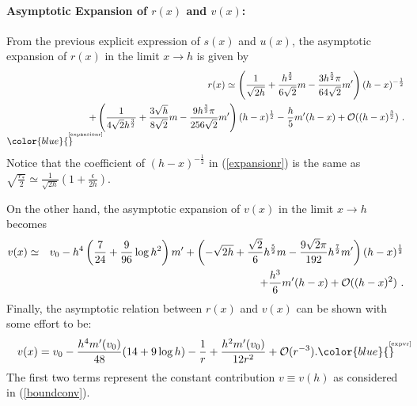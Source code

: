 \documentclass[12pt]{article}
\newcommand{\be}{\begin{equation}}
\newcommand{\ee}{\end{equation}}
\def\req#1{(\ref{#1})}
\def\s{\sigma}
\def\CO{{\cal O}}
\def\f#1#2{{\frac{#1}{#2}}}
\def\f#1#2{{\frac{#1}{#2}}}
\def\Label#1{\label{#1}%
{ \color{blue}{\smash{\hbox to0pt{\raise2ex\hbox{\tiny[#1]}\hss}}}}}
\def\s{\sqrt}
\def\f {\frac}
\def\no{\nonumber \\}
\def\ep{\epsilon}
\def\ba{\begin{eqnarray}}
\def\ea{\end{eqnarray}}
\begin{document}
\paragraph{Asymptotic Expansion of $r(x)$ and $v(x)$:}From the previous explicit
 expression of $s(x)$ and $u(x)$, the
asymptotic expansion of $r(x)$ in the limit $x\to h$ is given by
%
\ba
&& r(x)\simeq \left(\f{1}{\s{2h}}+\f{h^{\f32}}{6\s{2}}m
-\f{3h^{\f52}\pi}{64\s{2}}m'\right)(h-x)^{-\f{1}{2}}\no && \ \
+\left(\f{1}{4\s{2}h^{\f32}}+\f{3\s{h}}{8\s{2}}m
-\f{9h^{\f32}\pi}{256\s{2}}m'\right)
(h-x)^{\f{1}{2}}-\f{h}{5}m'(h-x)+\CO((h-x)^{\f{3}{2}}) \ .\no
\Label{expansionr} \ea
%
Notice that the coefficient of
$(h-x)^{-\f{1}{2}}$ in (\ref{expansionr}) is the same as $
\s{\f{r_*}{2}}\simeq \f{1}{\s{2h}}(1+\f{\ep}{2h})$.

On the other hand, the asymptotic expansion of $v(x)$ in the limit
$x\to h$ becomes
%
\ba v(x) &\simeq&
v_0-h^4\left(\f{7}{24}+\f{9}{96}\log h^2\right)m'+\left(-\s{2h}
+\f{\s{2}}{6}h^{\f{5}{2}}m -\f{9\s{2}\pi}{192}
h^{\f{7}{2}}m'\right)(h-x)^{\f{1}{2}}\no && \ \ \ \
+\f{h^3}{6}m'(h-x)+\CO((h-x)^2) \ .  \ea
%
Finally, the asymptotic relation between $r(x)$ and $v(x)$ can be
shown with some effort to be:
%
\be v(x)=v_{0}-\f{h^4m'(v_0)}{48}(14+9\log
h)-\f{1}{r}+\f{h^2m'(v_0)}{12r^2}+\CO(r^{-3}). \Label{expvr} \ee The
first two terms represent the constant contribution $v\equiv v(h)$
as considered in \req{boundconv}.



%
%
\end{document}
